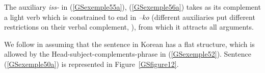 \documentclass[output=paper
                ,modfonts
                ,nonflat
	        ,collection
	        ,collectionchapter
	        ,collectiontoclongg
 	        ,biblatex
                ,babelshorthands
                ,newtxmath
                ,draftmode
                ,colorlinks, citecolor=brown
]{./langsci/langscibook}
\begin{document}
{\begin{exe}
    \label{GSexemple57}
\end{exe}

The auxiliary \emph{iss-} in (\ref{GSexemple55a}), (\ref{GSexemple56a}) takes as its complement a light verb which is constrained to end in \emph{–ko} (different auxiliaries put different restrictions on their verbal complement, \citealt{Yoo2003}), from which it attracts all arguments. 

We follow \cite{Chung98a-u} in assuming that the sentence in Korean has a flat structure, which is allowed by the Head-subject-complements-phrase in (\ref{GSexemple52}). Sentence (\ref{GSexemple50a}) is represented in Figure~\ref{GSfigure12}.

}
\end{document}

